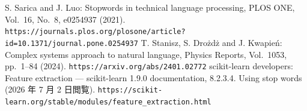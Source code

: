  S. Sarica and J. Luo: Stopwords in technical language processing, PLOS ONE, Vol.~16, No.~8, e0254937 (2021). {\tt https://journals.plos.org/plosone/article\allowbreak ?id=10.1371/journal.pone.0254937}
 T. Stanisz, S. Dro\.{z}d\.{z} and J. Kwapie\'{n}: Complex systems approach to natural language, Physics Reports, Vol.~1053, pp.~1--84 (2024). {\tt https://arxiv.org/abs/2401.02772}
 scikit-learn developers: Feature extraction --- scikit-learn 1.9.0 documentation, 8.2.3.4. Using stop words (2026 年 7 月 2 日閲覧). {\tt https://scikit-learn.org/stable/modules/feature\_extraction.html}
